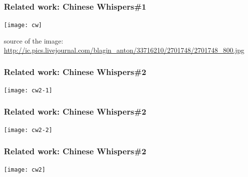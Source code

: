 \begin{frame}[fragile]
\frametitle{Related work: Chinese Whispers\#1}
\begin{center}
 \texttt{[image: cw]}
 
  {\tiny * source of the image: \url{http://ic.pics.livejournal.com/blagin_anton/33716210/2701748/2701748_800.jpg}}
 \end{center}
\end{frame}



\begin{frame}[fragile]
\frametitle{Related work: Chinese Whispers\#2}
\begin{center}
 \texttt{[image: cw2-1]}
 
 \end{center}
\end{frame}


\begin{frame}[fragile]
\frametitle{Related work: Chinese Whispers\#2}
\begin{center}
 \texttt{[image: cw2-2]}
 
 \end{center}
\end{frame}

\begin{frame}[fragile]
\frametitle{Related work: Chinese Whispers\#2}
\begin{center}
 \texttt{[image: cw2]}
 
 \end{center}
\end{frame}



